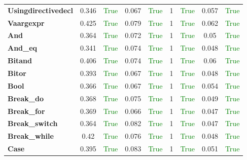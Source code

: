 \documentclass{article}
\begin{document}
\begin{xltabular}{\textwidth}{lcccccccc}
\textbf{{\fontsize{10}{12}\selectfont Usingdirectivedecl}}& 0.346&\textcolor{green}{True}& 0.067&\textcolor{green}{True}& 1&\textcolor{green}{True}& 0.057&\textcolor{green}{True} \\[0.5ex]
\textbf{{\fontsize{10}{12}\selectfont Vaargexpr}}& 0.425&\textcolor{green}{True}& 0.079&\textcolor{green}{True}& 1&\textcolor{green}{True}& 0.062&\textcolor{green}{True} \\[0.5ex]
\textbf{{\fontsize{10}{12}\selectfont And}}& 0.364&\textcolor{green}{True}& 0.072&\textcolor{green}{True}& 1&\textcolor{green}{True}& 0.05&\textcolor{green}{True} \\[0.5ex]
\textbf{{\fontsize{10}{12}\selectfont And\_eq}}& 0.341&\textcolor{green}{True}& 0.074&\textcolor{green}{True}& 1&\textcolor{green}{True}& 0.048&\textcolor{green}{True} \\[0.5ex]
\textbf{{\fontsize{10}{12}\selectfont Bitand}}& 0.406&\textcolor{green}{True}& 0.074&\textcolor{green}{True}& 1&\textcolor{green}{True}& 0.06&\textcolor{green}{True} \\[0.5ex]
\textbf{{\fontsize{10}{12}\selectfont Bitor}}& 0.393&\textcolor{green}{True}& 0.067&\textcolor{green}{True}& 1&\textcolor{green}{True}& 0.048&\textcolor{green}{True} \\[0.5ex]
\textbf{{\fontsize{10}{12}\selectfont Bool}}& 0.366&\textcolor{green}{True}& 0.067&\textcolor{green}{True}& 1&\textcolor{green}{True}& 0.054&\textcolor{green}{True} \\[0.5ex]
\textbf{{\fontsize{10}{12}\selectfont Break\_do}}& 0.368&\textcolor{green}{True}& 0.075&\textcolor{green}{True}& 1&\textcolor{green}{True}& 0.049&\textcolor{green}{True} \\[0.5ex]
\textbf{{\fontsize{10}{12}\selectfont Break\_for}}& 0.369&\textcolor{green}{True}& 0.066&\textcolor{green}{True}& 1&\textcolor{green}{True}& 0.047&\textcolor{green}{True} \\[0.5ex]
\textbf{{\fontsize{10}{12}\selectfont Break\_switch}}& 0.364&\textcolor{green}{True}& 0.082&\textcolor{green}{True}& 1&\textcolor{green}{True}& 0.047&\textcolor{green}{True} \\[0.5ex]
\textbf{{\fontsize{10}{12}\selectfont Break\_while}}& 0.42&\textcolor{green}{True}& 0.076&\textcolor{green}{True}& 1&\textcolor{green}{True}& 0.048&\textcolor{green}{True} \\[0.5ex]
\textbf{{\fontsize{10}{12}\selectfont Case}}& 0.395&\textcolor{green}{True}& 0.083&\textcolor{green}{True}& 1&\textcolor{green}{True}& 0.051&\textcolor{green}{True} \\[0.5ex]

\end{xltabular}
\end{document}
